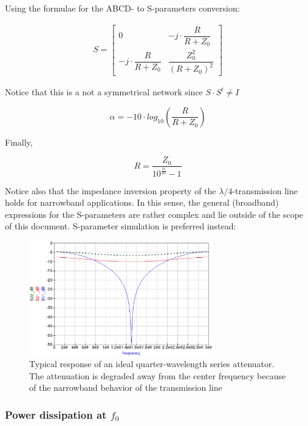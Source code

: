 \noindent Using the formulae for the ABCD- to S-parameters conversion:

\begin{gather}
 S = 
 \begin{bmatrix} 0 & -j\cdot \dfrac{R}{R+Z_0} \\ -j\cdot \dfrac{R}{R+Z_0} & \dfrac{Z_0^2}{(R+Z_0)^2} \end{bmatrix}
\end{gather}

\noindent Notice that this is a not a symmetrical network since $S \cdot S^t \neq I$

\begin{equation}
\alpha = -10 \cdot log_{10} \left( \dfrac{R}{R+Z_0}\right)
\end{equation}

\noindent Finally,

\begin{equation}
R = \dfrac{Z_0}{10^{\frac{\alpha}{20}}-1}
\end{equation}


\noindent Notice also that the impedance inversion property of the $\lambda/4$-transmission line holds for narrowband applications. In this sense, the general (broadband) expressions for the S-parameters are rather complex and lie outside of the scope of this document. S-parameter simulation is preferred instead:

\begin{figure}[ht]
\begin{center}
\includegraphics[width=8cm]{qw-series-typical-response}
\end{center}
\caption{Typical response of an ideal quarter-wavelength series attenuator. The attenuation is degraded away from the center frequency because of the narrowband behavior of the transmission line}
\label{fig:qw-series-att-response}
\end{figure}
\FloatBarrier



\subsubsection{Power dissipation at $f_0$}


